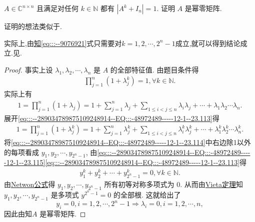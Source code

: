 \documentclass[../../main.tex]{subfiles}%
\begin{document}
\begin{example}\label{example:例题238--78971}
$A \in \mathbb{C}^{n \times n}$ 且满足对任何 $k \in \mathbb{N}$ 都有 $|A^k + I_n| = 1$. 证明 $A$ 是幂零矩阵.
\end{example}
\begin{note}
证明的想法类似于. 
\end{note}
\begin{remark}
实际上,由\hyperref[theorem:Netwon公式]知\eqref{eq:::--9076921}式只需要对$k=1,2,\cdots,2^n-1$成立,就可以得到结论成立.见.
\end{remark}
\begin{proof}

事实上设 $\lambda_1, \lambda_2, \cdots, \lambda_n$ 是 $A$ 的全部特征值. 由题目条件得
\begin{align}\label{eq:::--289034789875109248914--EQ:::-48972489-----12-1--23.113}
\prod_{j=1}^n (1 + \lambda_j^k) = 1, \forall k \in \mathbb{N}.
\end{align}
实际上有
\begin{align}\label{eq:::--289034789875109248914--EQ:::-48972489-----12-1--23.114}
1=\prod_{j=1}^n (1 + \lambda_j) = 1 + \sum\limits_{j=1}^n \lambda_j + \sum\limits_{1 \leqslant i < j \leqslant n} \lambda_i \lambda_j + \cdots + \lambda_1 \lambda_2 \cdots \lambda_n.
\end{align}
展开\eqref{eq:::--289034789875109248914--EQ:::-48972489-----12-1--23.113}得
\begin{align}\label{eq:::--289034789875109248914--EQ:::-48972489-----12-1--23.115}
1=\prod_{j=1}^n (1 + \lambda_j^k) = 1 + \sum_{j=1}^n \lambda_j^k + \sum_{1 \leqslant i < j \leqslant n} \lambda_i^k \lambda_j^k + \cdots + \lambda_1^k \lambda_2^k \cdots \lambda_n^k.
\end{align}
将\eqref{eq:::--289034789875109248914--EQ:::-48972489-----12-1--23.114}中右边除1以外的每项看成 $y_1, y_2, \cdots, y_{2^n - 1}$, 由\eqref{eq:::--289034789875109248914--EQ:::-48972489-----12-1--23.115}\eqref{eq:::--289034789875109248914--EQ:::-48972489-----12-1--23.113}得
\begin{align}
y_1^k + y_2^k + \cdots + y_{2^n - 1}^k = 0, \forall k \in \mathbb{N}.\label{eq:::--9076921}
\end{align}
由\hyperref[theorem:Netwon公式]{Netwon公式}得 $y_1, y_2, \cdots, y_{2^n - 1}$ 所有初等对称多项式为 $0$. 从而由\hyperref[theorem:Vieta定理]{Vieta定理}知 $y_1, y_2, \cdots, y_{2^n - 1}$ 是多项式 $y^{2^n - 1} = 0$ 的全部根. 这就给出了
$$y_i = 0, i = 1, 2, \cdots, 2^n - 1 \Rightarrow \lambda_i = 0, i = 1, 2, \cdots, n,$$
因此由知$A$ 是幂零矩阵.

\end{proof}
\end{document}
